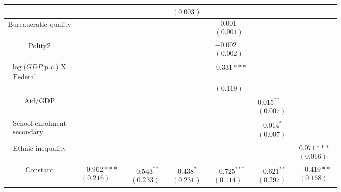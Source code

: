 \documentclass[10pt]{article}
\begin{document}
\begin{center}
\begin{tabular}{|c|c|c|c|c|c|c|}
\hline
 &  &  & $(0.003)$ &  &  &  \\
\hline
Bureaucratic quality &  &  &  & $\begin{array}{l}-0.001 \\ (0.001)\end{array}$ &  &  \\
\hline
Polity2 &  &  &  & $\begin{array}{l}-0.002 \\ (0.002)\end{array}$ &  &  \\
\hline
$\begin{array}{l}\log (G D P \text { p.c.) X } \\ \text { Federal }\end{array}$ &  &  &  & $-0.331 * * *$ &  &  \\
\hline
 &  &  &  & $(0.119)$ &  &  \\
\hline
Aid/GDP &  &  &  &  & $\begin{array}{l}0.015^{* *} \\ (0.007)\end{array}$ &  \\
\hline
$\begin{array}{l}\text { School enrolment } \\ \text { secondary }\end{array}$ &  &  &  &  & $\begin{array}{l}-0.014^{*} \\ (0.007)\end{array}$ &  \\
\hline
Ethnic inequality &  &  &  &  &  & $\begin{array}{l}0.071 * * * \\ (0.016)\end{array}$ \\
\hline
Constant & $\begin{array}{l}-0.962 * * * \\ (0.216)\end{array}$ & $\begin{array}{l}-0.543^{* *} \\ (0.233)\end{array}$ & $\begin{array}{l}-0.438^{*} \\ (0.231)\end{array}$ & $\begin{array}{l}-0.725^{* * *} \\ (0.114)\end{array}$ & $\begin{array}{l}-0.621^{* *} \\ (0.297)\end{array}$ & $\begin{array}{l}-0.419 * * \\ (0.168)\end{array}$ \\

\end{tabular}
\end{center}
\end{document}
